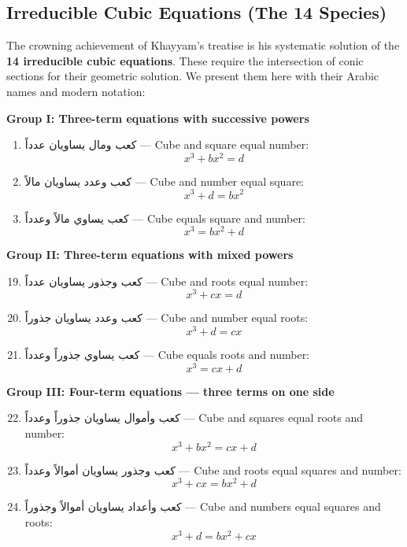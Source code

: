 \subsection{Irreducible Cubic Equations (The 14 Species)}

\label{subsec:irreducible}
The crowning achievement of Khayyam's treatise is his systematic solution of the 
\textbf{14 irreducible cubic equations}.
These require the intersection of conic sections for their geometric solution.
We present them here with their Arabic names and modern notation:

\begin{propositionbox}
\textbf{Group I: Three-term equations with successive powers}

\begin{enumerate}
[label=\arabic*.,resume,noitemsep]
\item 
\textarabic{كعب ومال يساويان عدداً} --- Cube and square equal number:    $$x^3 + b x^2 = d$$
\item 
\textarabic{كعب وعدد يساويان مالاً} --- Cube and number equal square:    $$x^3 + d = b x^2$$
\item 
\textarabic{كعب يساوي مالاً وعدداً} --- Cube equals square and number:    $$x^3 = b x^2 + d$$

\end{enumerate}

\textbf{Group II: Three-term equations with mixed powers}

\begin{enumerate}
[label=\arabic*.,resume,noitemsep]    
\setcounter{enumi}{18}
\item 
\textarabic{كعب وجذور يساويان عدداً} --- Cube and roots equal number:    $$x^3 + c x = d$$
\item 
\textarabic{كعب وعدد يساويان جذوراً} --- Cube and number equal roots:    $$x^3 + d = c x$$
\item 
\textarabic{كعب يساوي جذوراً وعدداً} --- Cube equals roots and number:    $$x^3 = c x + d$$

\end{enumerate}

\textbf{Group III: Four-term equations --- three terms on one side}

\begin{enumerate}
[label=\arabic*.,resume,noitemsep]    
\setcounter{enumi}{21}
\item 
\textarabic{كعب وأموال يساويان جذوراً وعدداً} --- Cube and squares equal roots and number:    $$x^3 + b x^2 = c x + d$$
\item 
\textarabic{كعب وجذور يساويان أموالاً وعدداً} --- Cube and roots equal squares and number:    $$x^3 + c x = b x^2 + d$$
\item 
\textarabic{كعب وأعداد يساويان أموالاً وجذوراً} --- Cube and numbers equal squares and roots:    $$x^3 + d = b x^2 + c x$$


\end{enumerate}
\end{propositionbox}
